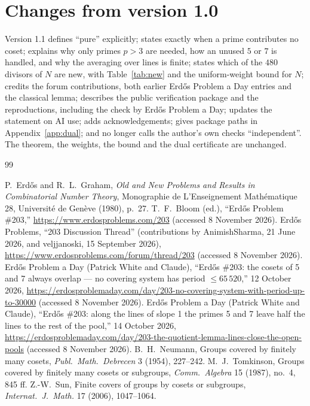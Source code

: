 \documentclass[11pt,a4paper]{article}
\begin{document}
\section*{Changes from version 1.0}
Version 1.1 defines ``pure'' explicitly; states exactly when a prime contributes no coset; explains why only primes $p>3$ are needed, how an unused $5$ or $7$ is handled, and why the averaging over lines is finite; states which of the $480$ divisors of $N$ are new, with Table~\ref{tab:new} and the uniform-weight bound for $N$; credits the forum contributions, both earlier Erd\H{o}s Problem a Day entries and the classical lemma; describes the public verification package and the reproductions, including the check by Erd\H{o}s Problem a Day; updates the statement on AI use; adds acknowledgements; gives package paths in Appendix~\ref{app:dual}; and no longer calls the author's own checks ``independent''. The theorem, the weights, the bound and the dual certificate are unchanged.

\begin{thebibliography}{99}\raggedright
{} P.~Erd\H{o}s and R.~L.~Graham,
\emph{Old and New Problems and Results in Combinatorial Number Theory},
Monographie de L'Enseignement Math\'ematique 28, Universit\'e de Gen\`eve (1980), p.~27.
 T.~F.~Bloom (ed.), ``Erd\H{o}s Problem \#203,''
\url{https://www.erdosproblems.com/203} (accessed 8 November 2026).
 Erd\H{o}s Problems, ``203 Discussion Thread'' (contributions by AnimishSharma, 21 June 2026, and veljjanoski, 15 September 2026),
\url{https://www.erdosproblems.com/forum/thread/203} (accessed 8 November 2026).
 Erd\H{o}s Problem a Day (Patrick White and Claude),
``Erd\H{o}s \#203: the cosets of 5 and 7 always overlap --- no covering system has period $\le 65\,520$,'' 12 October 2026,
\url{https://erdosproblemaday.com/day/203-no-covering-system-with-period-up-to-30000} (accessed 8 November 2026).
 Erd\H{o}s Problem a Day (Patrick White and Claude),
``Erd\H{o}s \#203: along the lines of slope 1 the primes 5 and 7 leave half the lines to the rest of the pool,'' 14 October 2026,
\url{https://erdosproblemaday.com/day/203-the-quotient-lemma-lines-close-the-open-pools} (accessed 8 November 2026).
 B.~H.~Neumann, Groups covered by finitely many cosets, \emph{Publ.\ Math.\ Debrecen} 3 (1954), 227--242.
 M.~J.~Tomkinson, Groups covered by finitely many cosets or subgroups, \emph{Comm.\ Algebra} 15 (1987), no.~4, 845 ff.
 Z.-W.~Sun, Finite covers of groups by cosets or subgroups, \emph{Internat.\ J.\ Math.} 17 (2006), 1047--1064.
\end{thebibliography}
\end{document}
